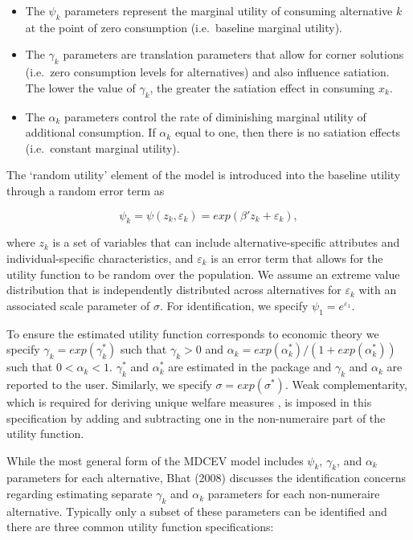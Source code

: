 \begin{itemize}
\tightlist
\item
  The \(\psi_k\) parameters represent the marginal utility of consuming
  alternative \(k\) at the point of zero consumption (i.e.~baseline
  marginal utility).
\item
  The \(\gamma_k\) parameters are translation parameters that allow for
  corner solutions (i.e.~zero consumption levels for alternatives) and
  also influence satiation. The lower the value of \(\gamma_k\), the
  greater the satiation effect in consuming \(x_k\).
\item
  The \(\alpha_k\) parameters control the rate of diminishing marginal
  utility of additional consumption. If \(\alpha_k\) equal to one, then
  there is no satiation effects (i.e.~constant marginal utility).
\end{itemize}

The `random utility' element of the model is introduced into the
baseline utility through a random error term as

\begin{equation}
\label{eq:psi}
\psi_k=\psi(z_k,\varepsilon_k)= exp(\beta'z_k+\varepsilon_k),
\end{equation}

\noindent where \(z_k\) is a set of variables that can include
alternative-specific attributes and individual-specific characteristics,
and \(\varepsilon_k\) is an error term that allows for the utility
function to be random over the population. We assume an extreme value
distribution that is independently distributed across alternatives for
\(\varepsilon_k\) with an associated scale parameter of \(\sigma\). For
identification, we specify \(\psi_1= e^{\varepsilon_1}\).

To ensure the estimated utility function corresponds to economic theory
we specify \(\gamma_k = exp(\gamma^*_k)\) such that \(\gamma_k > 0\) and
\(\alpha_k = exp(\alpha^*_k)/(1 + exp(\alpha^*_k))\) such that
\(0 < \alpha_k < 1\). \(\gamma^*_k\) and \(\alpha^*_k\) are estimated in
the package and \(\gamma_k\) and \(\alpha_k\) are reported to the user.
Similarly, we specify \(\sigma = exp(\sigma^*)\). Weak complementarity,
which is required for deriving unique welfare measures
\citep{malerenvironment1974}, is imposed in this specification by adding
and subtracting one in the non-numeraire part of the utility function.

While the most general form of the MDCEV model includes \(\psi_k\),
\(\gamma_k\), and \(\alpha_k\) parameters for each alternative, Bhat
(2008) discusses the identification concerns regarding estimating
separate \(\gamma_k\) and \(\alpha_k\) parameters for each non-numeraire
alternative. Typically only a subset of these parameters can be
identified and there are three common utility function specifications:

